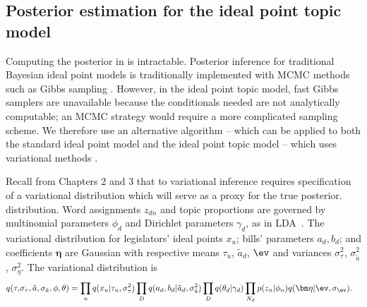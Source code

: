 






\subsection*{Posterior estimation for the ideal point topic model}
\label{sec:inference}
Computing the posterior in  is intractable.  Posterior
inference for traditional Bayesian ideal point models is traditionally
implemented with MCMC methods such as Gibbs sampling
\citep{johnson:1999ch6,jackman:2001,martin:2002,clinton:2004}.
However, in the ideal point topic model, fast Gibbs samplers are
unavailable because the conditionals needed are not analytically
computable; an MCMC strategy would require a more complicated sampling
scheme. We therefore use an alternative algorithm -- which can be applied
to both the standard ideal point model and the ideal point topic model
-- which uses variational methods \citep{jordan:1999}.

Recall from Chapters 2 and 3 that to variational inference requires
specification of a variational distribution which will serve as a
proxy for the true posterior.
distribution.  Word assignments $z_{dn}$ and topic proportions
are governed by multinomial parameters $\phi_d$ and Dirichlet
parameters $\gamma_d$, as in LDA~\citep{blei:2003}.  The variational
distribution for legislators' ideal points $x_u$; bills' parameters
$a_d, b_d$; and coefficients $\bm \eta$ are Gaussian with respective
means $\tau_u$, ${\tilde a}_d$, $\ev$ and variances $\sigma_\tau^2$,
$\sigma_{\tilde a}^2$, $\sigma_\eta^2$. The variational distribution is
\begin{align}
\label{eq:var_post}
q(\tau, & \sigma_\tau, {\tilde a}, \sigma_{\tilde a}, \phi, \theta) =
  \prod_u q(x_u | \tau_u, \sigma_\tau^2 ) \prod_D q(a_d, b_d |
{\tilde a}_d, \sigma_{\tilde a}^2 )
  \prod_D q(\theta_d | \gamma_d)
  \prod_{N_d} p(z_n | \phi_n) q(\bm \eta | \ev, \sigma_{\ev}).
\end{align}

